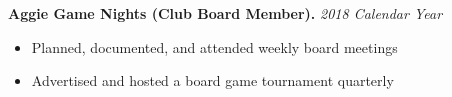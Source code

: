 \documentclass[letterpaper,11pt]{article}
\begin{document}
\textbf{Aggie Game Nights (Club Board Member).} \textit{2018 Calendar Year}
\begin{itemize}[noitemsep,topsep=0pt]
	\item Planned, documented, and attended weekly board meetings
	\item Advertised and hosted a board game tournament quarterly
\end{itemize}




%

%
%
%


\end{document}
